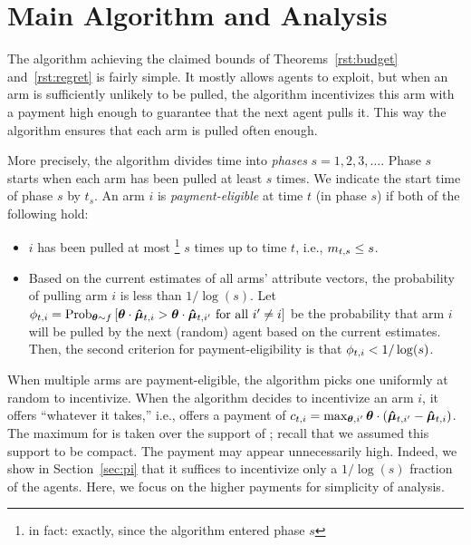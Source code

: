 \section{Main Algorithm and Analysis}
\label{sec:ub}


The algorithm achieving the claimed bounds of
Theorems~\ref{rst:budget} and~\ref{rst:regret} is fairly simple.
It mostly allows agents to exploit, but when an arm is sufficiently
unlikely to be pulled, 
the algorithm incentivizes this arm with a payment high enough
to guarantee that the next agent pulls it.
This way the algorithm ensures that each arm is pulled often enough.

More precisely, the algorithm divides time into \emph{phases}
$s = 1, 2, 3, \ldots$.
Phase $s$ starts when each arm has been pulled at least $s$ times.
We indicate the start time of phase $s$ by $t_s$. An arm $i$ is \emph{payment-eligible} at time $t$ (in phase $s$)
if both of the following hold:

\begin{itemize}
\item $i$ has been pulled at most%
\footnote{in fact: exactly, since the algorithm entered phase $s$}
$s$ times up to time $t$, i.e., $m_{t,s} \leq s$.
\item Based on the current estimates  of all arms'
attribute vectors, the probability of pulling arm $i$ is less than
$1/\log(s)$. Let $\PullProb{t}{i} = \Prob[\AgV \sim \AgentDist]{\AgV \cdot \ArmEV{t}{i} > \AgV
  \cdot \ArmEV{t}{i'} \mbox{ for all } i' \neq i}$
be the probability that arm $i$ will be pulled
by the next (random) agent based on the current estimates. 
Then, the second criterion for payment-eligibility is that
$\phi_{t,i} < 1/\log(s)$.
\end{itemize}

When multiple arms are payment-eligible, the algorithm picks one
uniformly at random to incentivize.
When the algorithm decides to incentivize an arm $i$,
it offers ``whatever it takes,'' i.e., offers a payment of
$c_{t,i} = \max_{\bm{\theta},i'} \bm{\theta} \cdot (\bm{\hat{\mu}}_{t,i'} - \bm{\hat{\mu}}_{t,i})$.
The maximum for \AgV is taken over the support of \AgentDist;
recall that we assumed this support to be compact.
The payment  may appear unnecessarily high.
Indeed, we show in Section~\ref{sec:pi} that it suffices to
incentivize only a $1/\log(s)$ fraction of the agents.
Here, we focus on the higher payments for simplicity of analysis.

